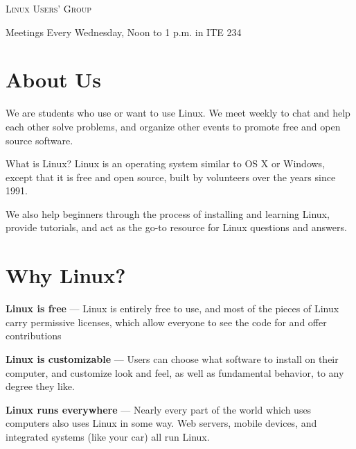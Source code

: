 \documentclass[11pt]{article}
\begin{document}
\begin{multicols*}{2}

\begin{center} \scshape \Huge
    Linux Users' Group
\end{center}

\begin{center} \Large
    Meetings
    Every Wednesday, Noon to 1 p.m. in ITE 234
\end{center}


\section*{About Us}

We are students who use or want to use Linux. We meet weekly to chat and help
each other solve problems, and organize other events to promote free and open
source software.

What is Linux? Linux is an operating system similar to OS X or Windows, except
that it is free and open source, built by volunteers over the years since 1991.

We also help beginners through the process of installing and learning Linux,
provide tutorials, and act as the go-to resource for Linux questions and
answers.

\section*{Why Linux?}

\vspace{0.5em}
\noindent
\textbf{Linux is free} --- Linux is entirely free to use, and most of the pieces
of Linux carry permissive licenses, which allow everyone to see the code for and
offer contributions

\vspace{0.5em}
\noindent
\textbf{Linux is customizable} --- Users can choose what software to install on
their computer, and customize look and feel, as well as fundamental behavior, to
any degree they like.

\vspace{0.5em}
\noindent
\textbf{Linux runs everywhere} --- Nearly every part of the world which uses
computers also uses Linux in some way. Web servers, mobile devices, and
integrated systems (like your car) all run Linux.


\end{multicols*}
\end{document}
